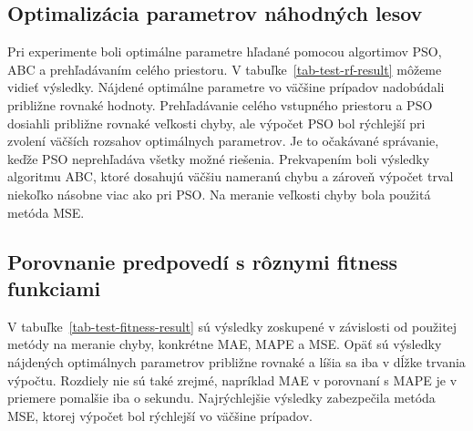 \documentclass[a4paper,slovak,12pt,appendix]{article}
\begin{document}

\subsection{Optimalizácia parametrov náhodných lesov}
Pri experimente boli optimálne parametre hľadané pomocou algortimov PSO, ABC a
prehľadávaním celého priestoru. V tabuľke~\ref{tab-test-rf-result} môžeme vidieť
výsledky. Nájdené optimálne parametre vo väčšine prípadov nadobúdali približne
rovnaké hodnoty. Prehľadávanie celého vstupného priestoru a PSO dosiahli približne
rovnaké veľkosti chyby, ale výpočet PSO bol rýchlejší pri zvolení väčších
rozsahov optimálnych parametrov. Je to očakávané správanie, keďže PSO neprehľadáva
všetky možné riešenia. Prekvapením boli výsledky algoritmu ABC, ktoré dosahujú
väčšiu nameranú chybu a zároveň výpočet trval niekoľko násobne viac ako pri PSO.
Na meranie veľkosti chyby bola použitá metóda MSE.


\subsection{Porovnanie predpovedí s rôznymi fitness funkciami}
V tabuľke~\ref{tab-test-fitness-result} sú výsledky zoskupené v závislosti od
použitej metódy na meranie chyby, konkrétne MAE, MAPE a MSE. Opäť sú výsledky
nájdených optimálnych parametrov približne rovnaké a líšia sa iba v dĺžke
trvania výpočtu. Rozdiely nie sú také zrejmé, napríklad MAE v porovnaní s MAPE
je v priemere pomalšie iba o sekundu. Najrýchlejšie výsledky zabezpečila metóda
MSE, ktorej výpočet bol rýchlejší vo väčšine prípadov.


\newpage
\end{document}
